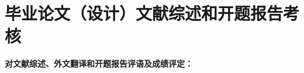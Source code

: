 
{
    \chapter*{毕业论文（设计）文献综述和开题报告考核}

    {
        \bfseries
        \noindent 对文献综述、外文翻译和开题报告评语及成绩评定：
    }

    \vfill

    \bfseries
    \mbox{} \vfill
    \thesisproposaleval[10][15][4]
    \signature[2019 年 1 月 22 日]{开题报告答辩小组负责人（签名）}
}
